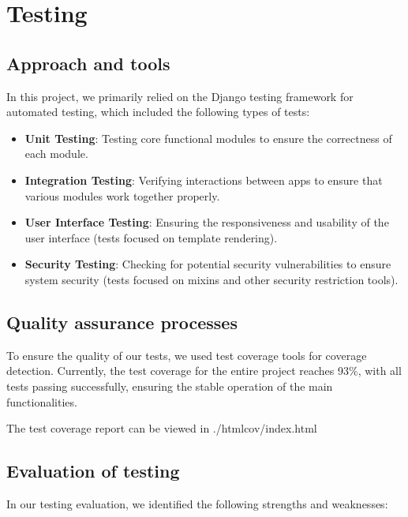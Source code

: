 \chapter{Testing}
\label{chap:testing}

\section{Approach and tools}
\label{sect:testing:approach}
In this project, we primarily relied on the Django testing framework for
automated testing, which included the following types of tests:

\begin{itemize}
\item
  \textbf{Unit Testing}: Testing core functional modules to ensure the
  correctness of each module.
\item
  \textbf{Integration Testing}: Verifying interactions between
  apps to ensure that various modules work together properly.
\item
  \textbf{User Interface Testing}: Ensuring the responsiveness and
  usability of the user interface (tests focused on template rendering).
\item
  \textbf{Security Testing}: Checking for potential security
  vulnerabilities to ensure system security (tests focused on mixins and
  other security restriction tools).
\end{itemize}

\section{Quality assurance processes}
\label{sect:testing:process}
To ensure the quality of our tests, we used test coverage tools for
coverage detection. Currently, the test coverage for the entire project
reaches 93\%, with all tests passing successfully, ensuring the stable
operation of the main functionalities.

The test coverage report can be viewed in ./htmlcov/index.html


\section{Evaluation of testing}
\label{sect:testing:evaluation}
In our testing evaluation, we identified the following strengths and
weaknesses:

